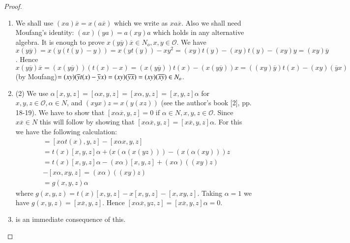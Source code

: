 \begin{proof}
  \begin{enumerate}
    \item  We shall use $(xa)\overline{x}=x(a\overline{x})$ which we write
  as $x a\overline{x}$. Also we shall need Moufang's identity:
  $(ax)(ya)=a(xy)a$ which holds in any alternative algebra. It is
  enough to prove $x(y \overline{y})\overline{x}\in
  N_o,x,y\in \mathcal{O}$. We have
  $x(y\overline{y})=x(y(t(y)-y))=x(yt(y))-xy^{2}=(xy)t(y)-(xy)t(y)-(xy)y=(xy)\overline{y}$. Hence
  $x(y\overline{y})\overline{x}=(x(y\overline{y}))(t(x)-x)=(x(y\overline{y}))t(x)-(x(y\overline{y}))x=((xy)\overline{y})t(x)-(xy)(\overline{y}x)$
  (by Moufang)$=(xy)(\overline{y} t(x)-\overline{y}
  x)=(xy)(\overline{y}\overline{x})=(xy)(\overline{x}\overline{y})\in
  N_o$. 
  \item (2) We use $\alpha[x,y,z]=[\alpha x, y, z]=[x\alpha, y,
    z]=[x,y,z]\alpha$ for\pageoriginale $x,y,z\in \mathcal{O},
  \alpha \in N$, and $(xyx)z=x(y(xz))$ (see the author's book
         [2], pp. 18-19). We have to show that $[x\alpha
           \overline{x},y,z]=0$ if $\alpha \in N, x, y, z\in
         \mathcal{O}$. Since $x\overline{x}\in N$ this will
         follow by showing that $[x\alpha
           \overline{x},y,z]=[x\overline{x},y,z]\alpha$. For this we
         have the following calculation:
         \begin{align*}
           [x\alpha \overline{x},y,z]&=[x \alpha t(x),y,z]-[x\alpha x,y,z]\\
           &=t(x)[x,y,z]\alpha + (x(\alpha(x(yz)))-(x(\alpha (xy)))z\\
           &=t(x)[x,y,z]\alpha - (x\alpha) [x,y,z]+(x\alpha)((xy)z)\\
           &-[x\alpha, xy,z]=(x\alpha)((xy)z)\\
           &=g(x,y,z)\alpha
         \end{align*}
         where $g(x,y,z)=t(x)[x,y,z]-x[x,y,z]-[x,x y,z]$. Taking $\alpha=1$ we
         have $g(x,y,z)=[x\overline{x},y,z]$. Hence $[x\alpha \overline{x}, yz,
           z]=[x\overline{x},y,z]\alpha=0$. 
       \item  is an immediate consequence of this. 
  \end{enumerate}


\end{proof}
